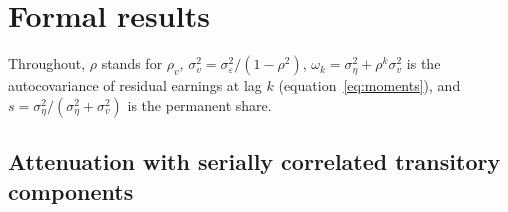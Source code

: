 \documentclass[11pt]{article}
\begin{document}
\section{Formal results}
\label{app:formal}

Throughout, $\rho$ stands for $\rho_v$, $\sigma^2_v = \sigma^2_\varepsilon/(1-\rho^2)$, $\omega_k = \sigma^2_\eta + \rho^{k}\sigma^2_v$ is the autocovariance of residual earnings at lag $k$ (equation~\eqref{eq:moments}), and $s = \sigma^2_\eta/(\sigma^2_\eta + \sigma^2_v)$ is the permanent share.

\subsection{Attenuation with serially correlated transitory components}
\label{app:atten}
\end{document}
